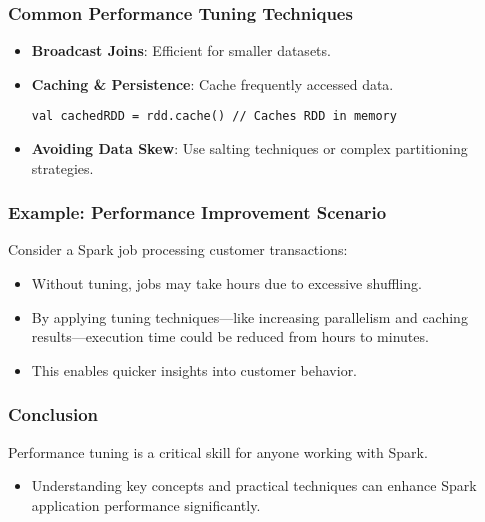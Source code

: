 \documentclass[aspectratio=169]{beamer}
\begin{document}
\begin{frame}[fragile]
    \frametitle{Common Performance Tuning Techniques}
    \begin{itemize}
        \item \textbf{Broadcast Joins}: Efficient for smaller datasets.
        \item \textbf{Caching \& Persistence}: Cache frequently accessed data.
        \begin{lstlisting}
val cachedRDD = rdd.cache() // Caches RDD in memory
        \end{lstlisting}
        \item \textbf{Avoiding Data Skew}: Use salting techniques or complex partitioning strategies.
    \end{itemize}
\end{frame}

\begin{frame}[fragile]
    \frametitle{Example: Performance Improvement Scenario}
    Consider a Spark job processing customer transactions:
    \begin{itemize}
        \item Without tuning, jobs may take hours due to excessive shuffling.
        \item By applying tuning techniques—like increasing parallelism and caching results—execution time could be reduced from hours to minutes.
        \item This enables quicker insights into customer behavior.
    \end{itemize}
\end{frame}

\begin{frame}[fragile]
    \frametitle{Conclusion}
    Performance tuning is a critical skill for anyone working with Spark. 
    \begin{itemize}
        \item Understanding key concepts and practical techniques can enhance Spark application performance significantly.
    \end{itemize}
\end{frame}
\end{document}
